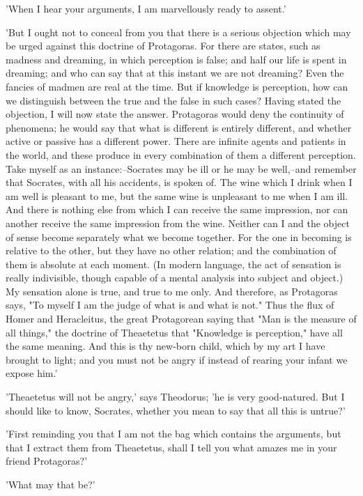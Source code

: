 'When I hear your arguments, I am marvellously ready to assent.'

'But I ought not to conceal from you that there is a serious objection
which may be urged against this doctrine of Protagoras. For there are
states, such as madness and dreaming, in which perception is false; and
half our life is spent in dreaming; and who can say that at this instant
we are not dreaming? Even the fancies of madmen are real at the time.
But if knowledge is perception, how can we distinguish between the true
and the false in such cases? Having stated the objection, I will now
state the answer. Protagoras would deny the continuity of phenomena;
he would say that what is different is entirely different, and whether
active or passive has a different power. There are infinite agents and
patients in the world, and these produce in every combination of them a
different perception. Take myself as an instance:--Socrates may be ill
or he may be well,--and remember that Socrates, with all his accidents,
is spoken of. The wine which I drink when I am well is pleasant to
me, but the same wine is unpleasant to me when I am ill. And there
is nothing else from which I can receive the same impression, nor can
another receive the same impression from the wine. Neither can I and the
object of sense become separately what we become together. For the one
in becoming is relative to the other, but they have no other relation;
and the combination of them is absolute at each moment. (In modern
language, the act of sensation is really indivisible, though capable of
a mental analysis into subject and object.) My sensation alone is true,
and true to me only. And therefore, as Protagoras says, "To myself I
am the judge of what is and what is not." Thus the flux of Homer and
Heracleitus, the great Protagorean saying that "Man is the measure of
all things," the doctrine of Theaetetus that "Knowledge is perception,"
have all the same meaning. And this is thy new-born child, which by my
art I have brought to light; and you must not be angry if instead of
rearing your infant we expose him.'

'Theaetetus will not be angry,' says Theodorus; 'he is very
good-natured. But I should like to know, Socrates, whether you mean to
say that all this is untrue?'

'First reminding you that I am not the bag which contains the arguments,
but that I extract them from Theaetetus, shall I tell you what amazes me
in your friend Protagoras?'

'What may that be?'

